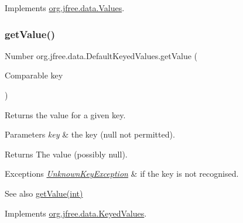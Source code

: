 Implements \mbox{\hyperlink{interfaceorg_1_1jfree_1_1data_1_1_values_a660d7e60de9e6ed7a3d2c22eb6578ced}{org.\+jfree.\+data.\+Values}}.

\mbox{\label{classorg_1_1jfree_1_1data_1_1_default_keyed_values_a57b0246b343f4831fcb5f306374d198a}} 
\subsubsection{\texorpdfstring{get\+Value()}{getValue()}\hspace{0.1cm}{\footnotesize\ttfamily [2/2]}}
{\footnotesize\ttfamily Number org.\+jfree.\+data.\+Default\+Keyed\+Values.\+get\+Value (\begin{DoxyParamCaption}\item[{Comparable}]{key }\end{DoxyParamCaption})}

Returns the value for a given key.


\begin{DoxyParams}{Parameters}
{\em key} & the key ({\ttfamily null} not permitted).\\
\hline
\end{DoxyParams}
\begin{DoxyReturn}{Returns}
The value (possibly {\ttfamily null}).
\end{DoxyReturn}

\begin{DoxyExceptions}{Exceptions}
{\em \mbox{\hyperlink{classorg_1_1jfree_1_1data_1_1_unknown_key_exception}{Unknown\+Key\+Exception}}} & if the key is not recognised.\\
\hline
\end{DoxyExceptions}
\begin{DoxySeeAlso}{See also}
\mbox{\hyperlink{classorg_1_1jfree_1_1data_1_1_default_keyed_values_a38fcea7e618e557e028940a48ffc61f0}{get\+Value(int)}} 
\end{DoxySeeAlso}


Implements \mbox{\hyperlink{interfaceorg_1_1jfree_1_1data_1_1_keyed_values_aa6bb7fe3ff33503d7f31b9be505c3a70}{org.\+jfree.\+data.\+Keyed\+Values}}.

\mbox{\label{classorg_1_1jfree_1_1data_1_1_default_keyed_values_a2e57ea8300157009409d60db38c7ea02}} 
